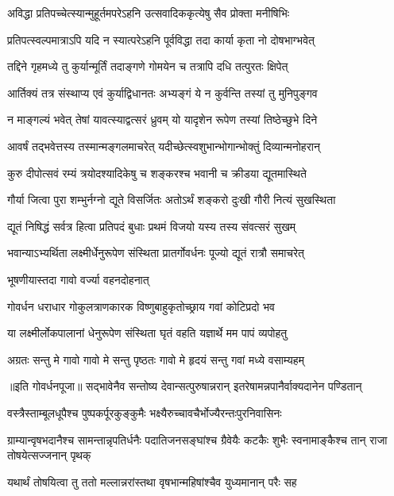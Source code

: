 \twolineshloka
{अविद्धा प्रतिपच्चेत्स्यान्मुहूर्तमपरेऽहनि}
{उत्सवादिककृत्येषु सैव प्रोक्ता मनीषिभिः} %

\twolineshloka
{प्रतिपत्स्वल्पमात्राऽपि यदि न स्यात्परेऽहनि}
{पूर्वविद्धा तदा कार्या कृता नो दोषभाग्भवेत्} %

\twolineshloka
{तद्दिने गृहमध्ये तु कुर्यान्मूर्तिं तदाङ्गणे}
{गोमयेन च तत्रापि दधि तत्पुरतः क्षिपेत्} %

\twolineshloka
{आर्तिक्यं तत्र संस्थाप्य एवं कुर्याद्विधानतः}
{अभ्यङ्गं ये न कुर्वन्ति तस्यां तु मुनिपुङ्गव} %

\twolineshloka
{न माङ्गल्यं भवेत् तेषां यावत्स्याद्वत्सरं ध्रुवम्}
{यो यादृशेन रूपेण तस्यां तिष्ठेच्छुभे दिने} %

\twolineshloka
{आवर्षं तद्भवेत्तस्य तस्मान्मङ्गलमाचरेत्}
{यदीच्छेत्स्वशुभान्भोगान्भोक्तुं दिव्यान्मनोहरान्} %

\twolineshloka
{कुरु दीपोत्सवं रम्यं त्रयोदश्यादिकेषु च}
{शङ्करश्च भवानी च क्रीडया द्यूतमास्थिते} %

\twolineshloka
{गौर्या जित्वा पुरा शम्भुर्नग्नो द्यूते विसर्जितः}
{अतोऽर्थं शङ्करो दुःखी गौरी नित्यं सुखस्थिता} %

\twolineshloka
{द्यूतं निषिद्धं सर्वत्र हित्वा प्रतिपदं बुधाः}
{प्रथमं विजयो यस्य तस्य संवत्सरं सुखम्} %

\twolineshloka
{भवान्याऽभ्यर्थिता लक्ष्मीर्धेनुरूपेण संस्थिता}
{प्रातर्गोवर्धनः पूज्यो द्यूतं रात्रौ समाचरेत्} %


\onelineshloka
{भूषणीयास्तदा गावो वर्ज्या वहनदोहनात्} %

\twolineshloka
{गोवर्धन धराधार गोकुलत्राणकारक}
{विष्णुबाहुकृतोच्छ्राय गवां कोटिप्रदो भव} %

\twolineshloka
{या लक्ष्मीर्लोकपालानां धेनुरूपेण संस्थिता}
{घृतं वहति यज्ञार्थे मम पापं व्यपोहतु} %

\twolineshloka
{अग्रतः सन्तु मे गावो गावो मे सन्तु पृष्ठतः}
{गावो मे हृदयं सन्तु गवां मध्ये वसाम्यहम्} %


॥इति गोवर्धनपूजा॥
\twolineshloka
{सद्भावेनैव सन्तोष्य देवान्सत्पुरुषान्नरान्}
{इतरेषामन्नपानैर्वाक्यदानेन पण्डितान्} %

\twolineshloka
{वस्त्रैस्ताम्बूलधूपैश्च पुष्पकर्पूरकुङ्कुमैः}
{भक्ष्यैरुच्चावचैर्भोज्यैरन्तःपुरनिवासिनः} %

\threelineshloka
{ग्राम्यान्वृषभदानैश्च सामन्तान्नृपतिर्धनैः}
{पदातिजनसङ्घांश्च ग्रैवेयैः कटकैः शुभैः}
{स्वनामाङ्कैश्च तान् राजा तोषयेत्सज्जनान् पृथक्} %

\twolineshloka
{यथार्थं तोषयित्वा तु ततो मल्लान्नरांस्तथा}
{वृषभान्महिषांश्चैव युध्यमानान् परैः सह} %

